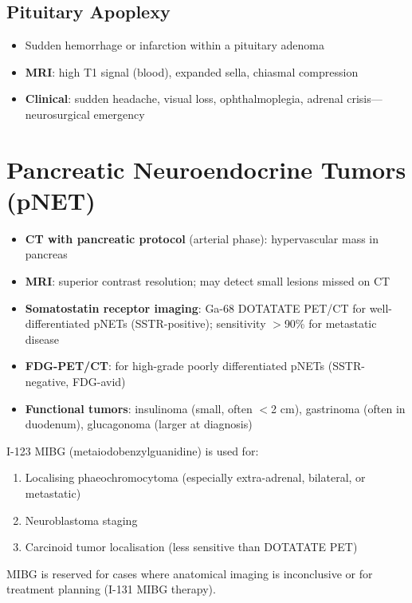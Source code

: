 \subsection{Pituitary Apoplexy}
\begin{itemize}
  \item Sudden hemorrhage or infarction within a pituitary adenoma
  \item \textbf{MRI}: high T1 signal (blood), expanded sella, chiasmal compression
  \item \textbf{Clinical}: sudden headache, visual loss, ophthalmoplegia, adrenal crisis---neurosurgical emergency
\end{itemize}

\section{Pancreatic Neuroendocrine Tumors (pNET)}
\begin{itemize}
  \item \textbf{CT with pancreatic protocol} (arterial phase): hypervascular mass in pancreas
  \item \textbf{MRI}: superior contrast resolution; may detect small lesions missed on CT
  \item \textbf{Somatostatin receptor imaging}: Ga-68 DOTATATE PET/CT for well-differentiated pNETs (SSTR-positive); sensitivity $>$90\% for metastatic disease
  \item \textbf{FDG-PET/CT}: for high-grade poorly differentiated pNETs (SSTR-negative, FDG-avid)
  \item \textbf{Functional tumors}: insulinoma (small, often $<$2 cm), gastrinoma (often in duodenum), glucagonoma (larger at diagnosis)
\end{itemize}

\begin{pearlbox}
I-123 MIBG (metaiodobenzylguanidine) is used for:
\begin{enumerate}
  \item Localising phaeochromocytoma (especially extra-adrenal, bilateral, or metastatic)
  \item Neuroblastoma staging
  \item Carcinoid tumor localisation (less sensitive than DOTATATE PET)
\end{enumerate}
MIBG is reserved for cases where anatomical imaging is inconclusive or for treatment planning (I-131 MIBG therapy).
\end{pearlbox}

